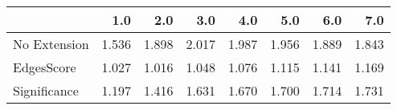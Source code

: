 \begin{tabular}{lrrrrrrr}
\toprule
{} &   1.0 &   2.0 &   3.0 &   4.0 &   5.0 &   6.0 &   7.0 \\
\midrule
No Extension & 1.536 & 1.898 & 2.017 & 1.987 & 1.956 & 1.889 & 1.843 \\
EdgesScore   & 1.027 & 1.016 & 1.048 & 1.076 & 1.115 & 1.141 & 1.169 \\
Significance & 1.197 & 1.416 & 1.631 & 1.670 & 1.700 & 1.714 & 1.731 \\
\bottomrule
\end{tabular}
